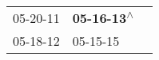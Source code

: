 \begin{supertabular}{lll}
 05-20-11\textsuperscript{} &  \textbf{05-16-13\textsuperscript{$\wedge$}} \\
 05-18-12\textsuperscript{} &                   05-15-15\textsuperscript{} \\
\end{supertabular}
